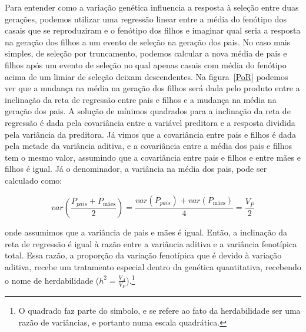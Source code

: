 \begin{refsection}
Para entender como a variação genética influencia a resposta à seleção entre
duas gerações, podemos utilizar uma regressão linear entre a média do fenótipo
dos casais que se reproduziram e o fenótipo dos filhos e imaginar qual seria a
resposta na geração dos filhos a um evento de seleção na geração dos pais. No
caso mais simples, de seleção por truncamento, podemos calcular a nova média
de pais e filhos após um evento de seleção no qual apenas casais com média do
fenótipo acima de um limiar de seleção deixam descendentes. Na
figura~\ref{PoR} podemos ver que a mudança na média na geração dos filhos será
dada pelo produto entre a inclinação da reta de regressão entre pais e filhos
e a mudança na média na geração dos pais. A solução de mínimos quadrados para
a inclinação da reta de regressão é dada pela covariância entre a variável
preditora e a resposta dividida pela variância da preditora. Já vimos que a
covariância entre pais e filhos é dada pela metade da variância aditiva, e a
covariância entre a média dos pais e filhos tem o mesmo valor, assumindo que a
covariância entre pais e filhos e entre mães e filhos é igual. Já o denominador, a
variância na média dos pais, pode ser calculado como:

\begin{equation}
var(\frac{P_{pais} + P_{\text{mães}}}{2}) = \frac{var(P_{pais}) + var(P_{\text{mães}})}{4} = \frac{V_P}{2}
\end{equation}

onde assumimos que a variância de pais e mães é igual. Então, a inclinação da
reta de regressão é igual à razão entre a variância aditiva e a variância
fenotípica total. Essa razão, a proporção da variação fenotípica que é devido
à variação aditiva, recebe um tratamento especial dentro da genética
quantitativa, recebendo o nome de herdabilidade ($h^2 =
\frac{V_A}{V_P}$).\footnote{O quadrado faz parte do simbolo, e se refere ao
fato da herdabilidade ser uma razão de variâncias, e portanto numa escala
quadrática.}


\end{refsection}
